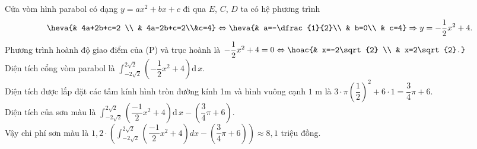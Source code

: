 \begin{bt}
{	Cửa vòm hình parabol có dạng  $y=ax^2+bx+c$ đi qua $E$, $C$, $D$ ta có hệ phương trình
	$$\heva{& 4a+2b+c=2 \\ & 4a-2b+c=2\\&c=4}\Leftrightarrow  \heva{& a=-\dfrac{1}{2}\\ & b=0\\
	& c=4} \Rightarrow  y=-\dfrac{1}{2}x^2+4.$$
	Phương trình hoành độ giao điểm của (P) và trục hoành là $-\dfrac{1}{2}x^2+4=0\Leftrightarrow  \hoac{& x=-2\sqrt{2} \\ & x=2\sqrt{2}.}$\\
	Diện tích cổng vòm parabol  là $\displaystyle\int_{-2\sqrt{2}}^{2\sqrt{2}}{\left(-\dfrac{1}{2}{x^2}+4\right)}\mathrm{d\,}x$.\\
	Diện tích được lắp đặt các tấm kính hình tròn đường  kính 1m và hình vuông cạnh $1$ m là
	 $3\cdot\pi{\left(\dfrac{1}{2}\right)^2}+6\cdot1=\dfrac{3}{4}\pi+6$.\\
	Diện tích của sơn màu  là $\displaystyle\int_{-2\sqrt{2}}^{2\sqrt{2}}{\left(\dfrac{-1}{2}x^2+4\right)}\mathrm{d\,}x-\left(\dfrac{3}{4}\pi+6\right)$.\\
	Vậy chi phí sơn màu là  $1{,}2\cdot\left(\displaystyle\int_{-2\sqrt{2}}^{2\sqrt{2}}{\left(\dfrac{-1}{2}{x^2}+4\right)}dx-\left(\dfrac{3}{4}\pi+6\right)\right)\approx 8{,}1$ triệu đồng.
	 }
\end{bt}

